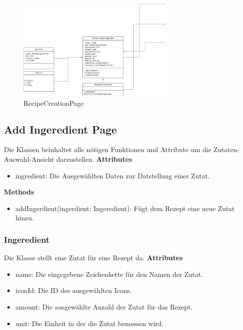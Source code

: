 \documentclass[parskip=full]{scrartcl}
\begin{document}
        
        \begin{figure}[htp]
               \centering
               \includegraphics[height = 50mm]{images/presentationLayer/recipeCreationPage.png}
               \caption{RecipeCreationPage}
        \end{figure}

        \newpage
        
        \subsection{Add Ingeredient Page}
            Die Klassen beinhaltet alle nötigen Funktionen und Attribute um die Zutaten-Auswahl-Ansicht darzustellen.\newline
        \textbf{Attributes}
        \begin{itemize}
            \item ingredient: Die Ausgewählten Daten zur Datstellung einer Zutat.
        \end{itemize}
        
        \textbf{Methods}
        \begin{itemize}
            \item addIngerdient(ingerdient: Ingeredient): Fügt dem Rezept eine neue Zutat hinzu. 
        \end{itemize}
        
            \subsubsection{Ingeredient}
                Die Klasse stellt eine Zutat für eine Rezept da.
                \textbf{Attributes}
                    \begin{itemize}
                        \item name: Die eingegebene Zeichenkette für den Namen der Zutat.
                        \item iconId: Die ID des ausgewählten Icons.
                        \item amount: Die ausgewählte Anzahl der Zutat für das Rezept.
                        \item unit: Die Einheit in der die Zutat bemessen wird.
                    \end{itemize}
                    
\end{document}
